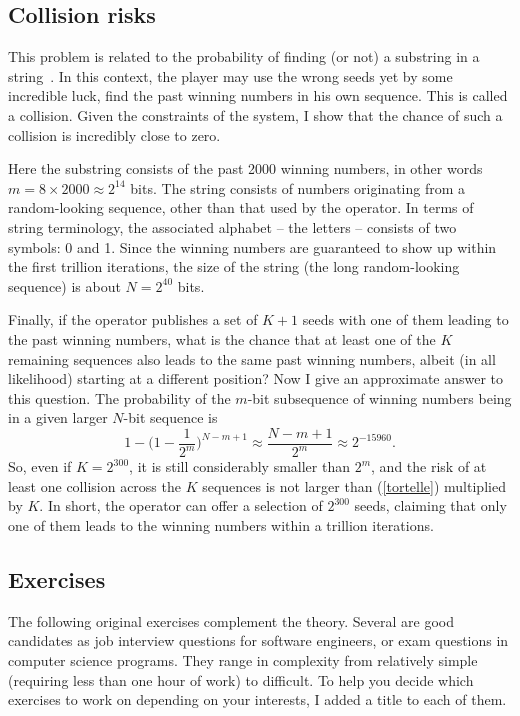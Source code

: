 \documentclass[oneside,10pt]{book}
\begin{document}
\subsection{Collision risks}\label{uitres}


This problem is related to the probability of finding (or not) a substring in a string~\cite{noonan99}. In this context, the player may use the wrong  seeds yet by some incredible luck, find the past winning numbers in his own sequence. This is called a collision. Given the constraints of the system, I show that the chance of such a collision is incredibly close to zero.

Here the substring consists of the past 2000 winning numbers, in other words $m=8\times 2000 \approx 2^{14}$ bits. 
The string consists of numbers originating from a random-looking sequence, other than that used by the operator. In terms of string terminology, the associated alphabet -- the letters -- consists of two symbols: 0 and 1. 
Since the winning numbers are guaranteed to show up within the first trillion iterations, the size of the string (the long random-looking sequence) is about $N=2^{40}$ bits. 

Finally, if the operator publishes a set of $K + 1$ seeds with one of them leading to the past winning numbers, what is the chance that at least one of the $K$ remaining sequences also leads to the same past winning numbers, albeit (in all likelihood) starting at a different position? 
Now I give an approximate answer to this question. The probability of the $m$-bit subsequence of winning numbers being in a given larger $N$-bit sequence is
\begin{equation}
1- \Big(1- \frac{1}{2^m}\Big)^{N-m+1} \approx \frac{N-m+1}{2^m} \approx 2^{-15960}.\label{tortelle}
\end{equation}
So, even if $K=2^{300}$, it is still considerably smaller than $2^m$, and the risk of at least one collision across the $K$ sequences is 
  not larger than (\ref{tortelle}) multiplied by $K$. In short, the operator can offer a selection of $2^{300}$ seeds, claiming
 that only one of them leads to the winning numbers within a trillion iterations. 
 

\subsection{Exercises}

The following original exercises complement the theory. Several are good candidates as job interview questions for
 software engineers, or exam questions in computer science programs. They range in complexity from relatively simple (requiring less than one hour of work) to difficult. To help
 you decide which exercises to work on depending on your interests, I added a title to each of them.
\end{document}
